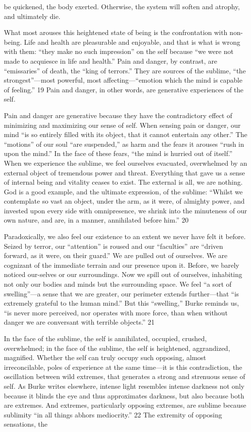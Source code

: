 be quickened, the body exerted. Otherwise, the system will soften and atrophy, and ultimately die.{\par} What most arouses this heightened state of being is the confrontation with non-being. Life and health are pleasurable and enjoyable, and that is what is wrong with them: “they make no such impression” on the self because “we were not made to acquiesce in life and health.” Pain and danger, by contrast, are “emissaries” of death, the “king of terrors.” They are sources of the sublime, “the strongest”—most powerful, most affecting—“emotion which the mind is capable of feeling.” {\color{blue} 19 } Pain and danger, in other words, are generative experiences of the self.{\par} Pain and danger are generative because they have the contradictory effect of minimizing and maximizing our sense of self. When sensing pain or danger, our mind “is so entirely filled with its object, that it cannot entertain any other.” The “motions” of our soul “are suspended,” as harm and the fears it arouses “rush in upon the mind.” In the face of these fears, “the mind is hurried out of itself.” When we experience the sublime, we feel ourselves evacuated, overwhelmed by an external object of tremendous power and threat. Everything that gave us a sense of internal being and vitality ceases to exist. The external is all, we are nothing. God is a good example, and the ultimate expression, of the sublime: “Whilst we contemplate so vast an object, under the arm, as it were, of almighty power, and invested upon every side with omnipresence, we shrink into the minuteness of our own nature, and are, in a manner, annihilated before him.” {\color{blue} 20 } {\par} Paradoxically, we also feel our existence to an extent we never have felt it before. Seized by terror, our “attention” is roused and our “faculties” are “driven forward, as it were, on their guard.” We are pulled out of ourselves. We are cognizant of the immediate terrain and our presence upon it. Before, we barely noticed our-selves or our surroundings. Now we spill out of ourselves, inhabiting not only our bodies and minds but the surrounding space. We feel “a sort of swelling”—a sense that we are greater, our perimeter extends further—that “is extremely grateful to the human mind.” But this “swelling,” Burke reminds us, “is never more perceived, nor operates with more force, than when without danger we are conversant with terrible objects.” {\color{blue} 21 } {\par} In the face of the sublime, the self is annihilated, occupied, crushed, overwhelmed; in the face of the sublime, the self is heightened, aggrandized, magnified. Whether the self can truly occupy such opposing, almost irreconcilable, poles of experience at the same time—it is this contradiction, the oscillation between wild extremes, that generates a strong and strenuous sense of self. As Burke writes elsewhere, intense light resembles intense darkness not only because it blinds the eye and thus approximates darkness, but also because both are extremes. And extremes, particularly opposing extremes, are sublime because sublimity “in all things abhors mediocrity.” {\color{blue} 22 } The extremity of opposing sensations, the 